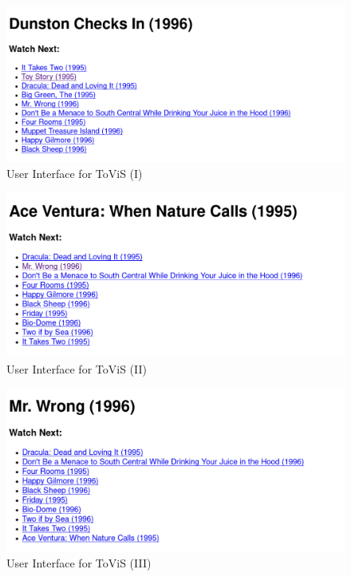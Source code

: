 \begin{figure}[htb]
\centering
\includegraphics[scale=0.35]{images/img1}
\caption{User Interface for ToViS (I)}
\label{res:5}
\end{figure}

\begin{figure}[htb]
\centering
\includegraphics[scale=0.35]{images/img2}
\caption{User Interface for ToViS (II)}
\label{res:6}
\end{figure}

\begin{figure}[htb]
\centering
\includegraphics[scale=0.35]{images/img3}
\caption{User Interface for ToViS (III)}
\label{res:7}
\end{figure}

